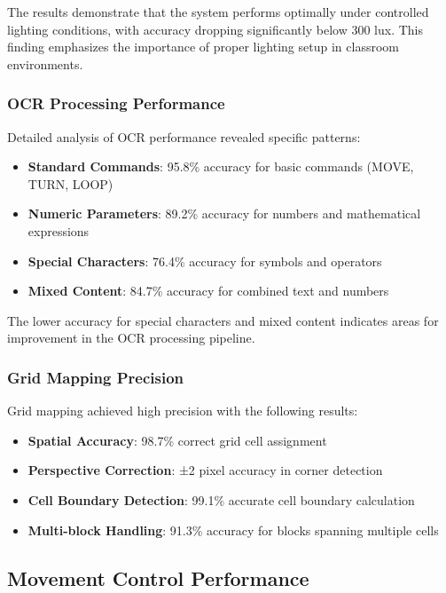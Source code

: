 The results demonstrate that the system performs optimally under controlled lighting conditions, with accuracy dropping significantly below 300 lux. This finding emphasizes the importance of proper lighting setup in classroom environments.

\subsubsection{OCR Processing Performance}

Detailed analysis of OCR performance revealed specific patterns:

\begin{itemize}
    \item \textbf{Standard Commands}: 95.8\% accuracy for basic commands (MOVE, TURN, LOOP)
    \item \textbf{Numeric Parameters}: 89.2\% accuracy for numbers and mathematical expressions
    \item \textbf{Special Characters}: 76.4\% accuracy for symbols and operators
    \item \textbf{Mixed Content}: 84.7\% accuracy for combined text and numbers
\end{itemize}

The lower accuracy for special characters and mixed content indicates areas for improvement in the OCR processing pipeline.

\subsubsection{Grid Mapping Precision}

Grid mapping achieved high precision with the following results:
\begin{itemize}
    \item \textbf{Spatial Accuracy}: 98.7\% correct grid cell assignment
    \item \textbf{Perspective Correction}: ±2 pixel accuracy in corner detection
    \item \textbf{Cell Boundary Detection}: 99.1\% accurate cell boundary calculation
    \item \textbf{Multi-block Handling}: 91.3\% accuracy for blocks spanning multiple cells
\end{itemize}

\subsection{Movement Control Performance}

